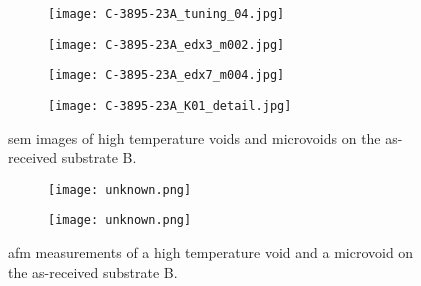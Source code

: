 \begin{figure}[htbp]
    \centering
    \begin{subfigure}[t]{\textwidth}
          \begin{minipage}[t]{0.49\linewidth}
            \centering
            \texttt{[image: C-3895-23A\_tuning\_04.jpg]}
          \end{minipage}
          \hfill
          \begin{minipage}[t]{0.49\linewidth}
            \centering
            \texttt{[image: C-3895-23A\_edx3\_m002.jpg]}
          \end{minipage}
    \caption{}\label{fig:subBa_high-temperature-voids}
    \end{subfigure}%
    \par\bigskip
    \begin{subfigure}[t]{\textwidth}
          \begin{minipage}[t]{0.49\linewidth}
            \centering
            \texttt{[image: C-3895-23A\_edx7\_m004.jpg]}
          \end{minipage}
          \hfill
          \begin{minipage}[t]{0.49\linewidth}
            \centering
            \texttt{[image: C-3895-23A\_K01\_detail.jpg]}
          \end{minipage}
    \caption{}\label{fig:subBa_microvoids}
    \end{subfigure}%
    \caption[\Ac{sem} images of voids on substrate B.]{\Acf{sem} images of  high temperature voids and  microvoids on the as-received substrate B.}
    \label{fig:SEM_C389523_voids}
\end{figure}

\begin{figure}
    \begin{subfigure}[t]{0.49\linewidth}
        \texttt{[image: unknown.png]}
        \caption{}\label{fig:subBa_afm_void}
    \end{subfigure}%
    \hfill
    \begin{subfigure}[t]{0.49\linewidth}
        \texttt{[image: unknown.png]}
        \caption{}\label{fig:subBa_afm_microvoid}
    \end{subfigure}%
    \caption[\Ac{afm} measurements of void and microvoid on as-received substrate B.]{\Acf{afm} measurements of  a high temperature void and  a microvoid on the as-received substrate B.}
    \label{fig:subBa_afm_voids}
\end{figure}

